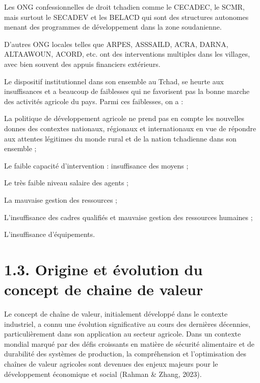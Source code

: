 \documentclass[12pt,oneside]{report}
\begin{document}
Les ONG confessionnelles de droit tchadien comme le CECADEC, le SCMR, mais surtout le SECADEV et les BELACD qui sont des structures autonomes menant des programmes de développement dans la zone soudanienne.

D’autres ONG locales telles que ARPES, ASSSAILD, ACRA, DARNA, ALTAAWOUN, ACORD, etc. ont des interventions multiples dans les villages, avec bien souvent des appuis financiers extérieurs.

Le dispositif institutionnel dans son ensemble au Tchad, se heurte aux insuffisances et a beaucoup de faiblesses qui ne favorisent pas la bonne marche des activités agricole du pays. Parmi ces faiblesses, on a :

La politique de développement agricole ne prend pas en compte les nouvelles donnes des contextes nationaux, régionaux et internationaux en vue de répondre aux attentes légitimes du monde rural et de la nation tchadienne dans son ensemble ;

Le faible capacité d’intervention : insuffisance des moyens ;

Le très faible niveau salaire des agents ;

La mauvaise gestion des ressources ;

L’insuffisance des cadres qualifiés et mauvaise gestion des ressources humaines ;

L’insuffisance d’équipements.

\section{1.3. Origine et évolution du concept de chaine de valeur}
Le concept de chaîne de valeur, initialement développé dans le contexte industriel, a connu une évolution significative au cours des dernières décennies, particulièrement dans son application au secteur agricole. Dans un contexte mondial marqué par des défis croissants en matière de sécurité alimentaire et de durabilité des systèmes de production, la compréhension et l'optimisation des chaînes de valeur agricoles sont devenues des enjeux majeurs pour le développement économique et social (Rahman \& Zhang, 2023).
\end{document}
